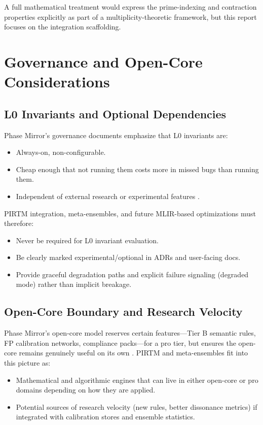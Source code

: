 \documentclass[11pt]{article}
\begin{document}
A full mathematical treatment would express the prime-indexing and contraction properties explicitly as part of a multiplicity-theoretic framework, but this report focuses on the integration scaffolding.

\section{Governance and Open-Core Considerations}

\subsection{L0 Invariants and Optional Dependencies}

Phase Mirror's governance documents emphasize that L0 invariants are:
\begin{itemize}
  \item Always-on, non-configurable.
  \item Cheap enough that not running them costs more in missed bugs than running them.
  \item Independent of external research or experimental features \cite{pm-mvp-analysis,pm-open-core-dev}.
\end{itemize}

PIRTM integration, meta-ensembles, and future MLIR-based optimizations must therefore:
\begin{itemize}
  \item Never be required for L0 invariant evaluation.
  \item Be clearly marked experimental/optional in ADRs and user-facing docs.
  \item Provide graceful degradation paths and explicit failure signaling (degraded mode) rather than implicit breakage.
\end{itemize}

\subsection{Open-Core Boundary and Research Velocity}

Phase Mirror's open-core model reserves certain features---Tier B semantic rules, FP calibration networks, compliance packs---for a pro tier, but ensures the open-core remains genuinely useful on its own \cite{pm-open-core-dev,pm-mvp-analysis}. PIRTM and meta-ensembles fit into this picture as:
\begin{itemize}
  \item Mathematical and algorithmic engines that can live in either open-core or pro domains depending on how they are applied.
  \item Potential sources of research velocity (new rules, better dissonance metrics) if integrated with calibration stores and ensemble statistics.
\end{itemize}
\end{document}
